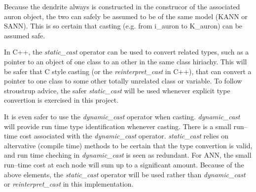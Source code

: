 
	Because the dendrite always is constructed in the construcor of the associated auron object, the two can safely be assumed to be %
		of the same model (KANN or SANN). %
	This is so certain that casting (e.g. from i\_auron to K\_auron) can be assumed safe.

	In C++, the \emph{static\_cast} operator can be used to convert related types, such as a pointer to an object of one class to an other in the same class hiriachy. 
	This will be safer that C style casting (or the \emph{reinterpret\_cast} in C++), that can convert a pointer to one class to some other totally unrelated class or variable.
	To follow stroustrup advice, %
	the safer \emph{static\_cast} will be used whenever explicit type convertion is exercised in this project.

	It is even safer to use the \emph{dynamic\_cast} operator when casting. \emph{dynamic\_cast} will provide run time type identification whenever casting. %
	There is a small run--time cost associated with the \emph{dynamic\_cast} operator. 
	\emph{static\_cast} relies on altervative (compile time) methods to be certain that the type convertion is valid, and run time cheching in \emph{dynamic\_cast} is seen as redundant.
	For ANN, the small run--time cost at each node will sum up to a significant amount.
	Because of the above elements, the \emph{static\_cast} operator will be used rather than \emph{dynamic\_cast} or \emph{reinterpret\_cast} in this implementation.





